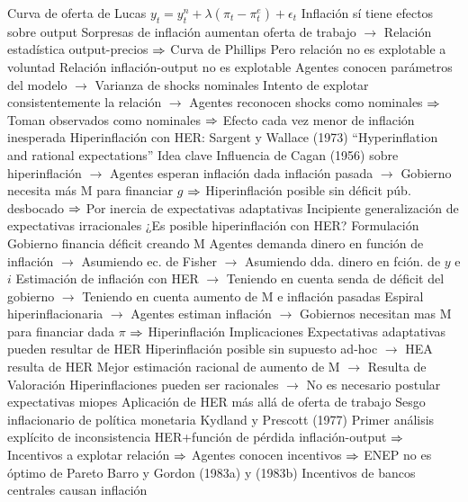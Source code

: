 \documentclass{nuevotema}
\begin{document}
\begin{esquemal}
				\4 Curva de oferta de Lucas
				\4[] $y_t = y_t^n + \lambda (\pi_t - \pi_t^e )+\epsilon_t$
				\4 Inflación sí tiene efectos sobre output
				\4[] Sorpresas de inflación aumentan oferta de trabajo
				\4[] $\to$ Relación estadística output-precios
				\4[] $\Rightarrow$ Curva de Phillips
				\4[] Pero relación no es explotable a voluntad
				\4 Relación inflación-output no es explotable
				\4[] Agentes conocen parámetros del modelo
				\4[] $\to$ Varianza de shocks nominales
				\4[] Intento de explotar consistentemente la relación
				\4[] $\to$ Agentes reconocen shocks como nominales
				\4[] $\Rightarrow$ Toman observados como nominales
				\4[] $\Rightarrow$ Efecto cada vez menor de inflación inesperada
			\3 Hiperinflación con HER: Sargent y Wallace (1973)
				\4 ``Hyperinflation and rational expectations''
				\4 Idea clave
				\4[] Influencia de Cagan (1956) sobre hiperinflación
				\4[] $\to$ Agentes esperan inflación dada inflación pasada
				\4[] $\to$ Gobierno necesita más M para financiar $g$
				\4[] $\Rightarrow$ Hiperinflación posible sin déficit púb. desbocado
				\4[] $\Rightarrow$ Por inercia de expectativas adaptativas
				\4[] Incipiente generalización de expectativas irracionales
				\4[] ¿Es posible hiperinflación con HER?
				\4 Formulación
				\4[] Gobierno financia déficit creando M
				\4[] Agentes demanda dinero en función de inflación
				\4[] $\to$ Asumiendo ec. de Fisher
				\4[] $\to$ Asumiendo dda. dinero en fción. de $y$ e $i$
				\4[] Estimación de inflación con HER
				\4[] $\to$ Teniendo en cuenta senda de déficit del gobierno
				\4[] $\to$ Teniendo en cuenta aumento de M e inflación pasadas
				\4[] Espiral hiperinflacionaria
				\4[] $\to$ Agentes estiman inflación
				\4[] $\to$ Gobiernos necesitan mas M para financiar dada $\pi$
				\4[] $\Rightarrow$ Hiperinflación
				\4 Implicaciones
				\4[] Expectativas adaptativas pueden resultar de HER
				\4[] Hiperinflación posible sin supuesto ad-hoc
				\4[] $\to$ HEA resulta de HER
				\4[] Mejor estimación racional de aumento de M
				\4[] $\to$ Resulta de
				\4 Valoración
				\4[] Hiperinflaciones pueden ser racionales
				\4[] $\to$ No es necesario postular expectativas miopes
				\4[] Aplicación de HER más allá de oferta de trabajo
			\3 Sesgo inflacionario de política monetaria
				\4 Kydland y Prescott (1977)
				\4[] Primer análisis explícito de inconsistencia
				\4[] HER+función de pérdida inflación-output
				\4[] $\Rightarrow$ Incentivos a explotar relación
				\4[] $\Rightarrow$ Agentes conocen incentivos
				\4[] $\Rightarrow$ ENEP no es óptimo de Pareto
				\4 Barro y Gordon (1983a) y (1983b)
				\4 Incentivos de bancos centrales causan inflación

\end{esquemal}
\end{document}
